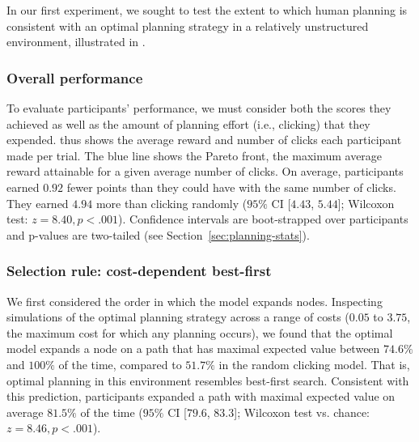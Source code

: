 In our first experiment, we sought to test the extent to which human planning is consistent with an optimal planning strategy in a relatively unstructured environment, illustrated in .

\subsubsection{Overall performance}\label{sec:planning-overall}

To evaluate participants' performance, we must consider both the scores they achieved as well as the amount of planning effort (i.e., clicking) that they expended.  thus shows the average reward and number of clicks each participant made per trial. The blue line shows the Pareto front, the maximum average reward attainable for a given average number of clicks. On average, participants earned $0.92$ fewer points than they could have with the same number of clicks. They earned $4.94$ more than clicking randomly ($95\%$ CI [$4.43$, $5.44$]; Wilcoxon test: $z = 8.40, p < .001$). Confidence intervals are boot-strapped over participants and p-values are two-tailed (see Section~\ref{sec:planning-stats}).

\subsubsection{Selection rule: cost-dependent best-first}\label{sec:planning-selection}
We first considered the order in which the model expands nodes. Inspecting simulations of the optimal planning strategy across a range of costs ($0.05$ to $3.75$, the maximum cost for which any planning occurs), we found that the optimal model expands a node on a path that has maximal expected value between $74.6\%$ and $100\%$ of the time, compared to $51.7\%$ in the random clicking model.
That is, optimal planning in this environment resembles best-first search. Consistent with this prediction, participants expanded a path with maximal expected value on average $81.5\%$ of the time ($95\%$ CI [$79.6$, $83.3$]; Wilcoxon test vs. chance: $z = 8.46, p < .001$).

